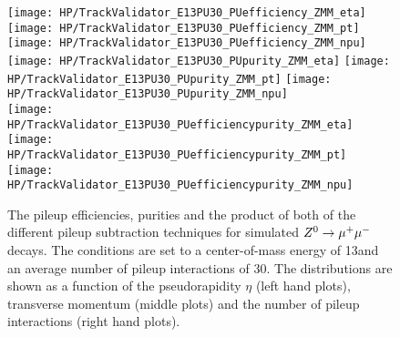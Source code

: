 \begin{figure}[!t]
    \centering
    \texttt{[image: HP/TrackValidator\_E13PU30\_PUefficiency\_ZMM\_eta]}
    \texttt{[image: HP/TrackValidator\_E13PU30\_PUefficiency\_ZMM\_pt]}
    \texttt{[image: HP/TrackValidator\_E13PU30\_PUefficiency\_ZMM\_npu]}
    \\
    \texttt{[image: HP/TrackValidator\_E13PU30\_PUpurity\_ZMM\_eta]}
    \texttt{[image: HP/TrackValidator\_E13PU30\_PUpurity\_ZMM\_pt]}
    \texttt{[image: HP/TrackValidator\_E13PU30\_PUpurity\_ZMM\_npu]}
    \\
    \texttt{[image: HP/TrackValidator\_E13PU30\_PUefficiencypurity\_ZMM\_eta]}
    \texttt{[image: HP/TrackValidator\_E13PU30\_PUefficiencypurity\_ZMM\_pt]}
    \texttt{[image: HP/TrackValidator\_E13PU30\_PUefficiencypurity\_ZMM\_npu]}
    \caption[Pileup efficiencies, purities and their product of the different pileup subtraction techniques based on simulated $\Zz\rightarrow\MM$ decays with 13\TeV and $\left<PU\right>=30$]{The pileup efficiencies, purities and the product of both of the different pileup subtraction techniques for simulated $\Zz\rightarrow\MM$ decays. The conditions are set to a center-of-mass energy of 13\TeV and an average number of pileup interactions of 30. The distributions are shown as a function of the pseudorapidity $\eta$ (left hand plots), transverse momentum (middle plots) and the number of pileup interactions (right hand plots). \label{plot:HPUTAE13PU30ZtomumuPUComp}}
\end{figure}


